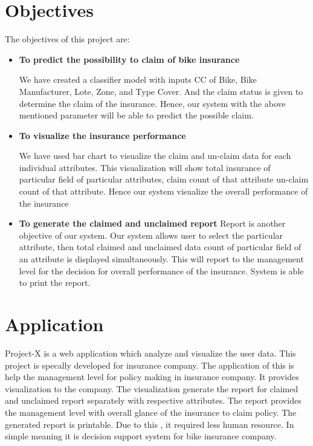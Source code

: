 \newpage
\section{Objectives}\label{sec:obj}
The objectives of this project are:
\begin{itemize}
\item \textbf{To predict the possibility to claim of bike insurance}
\par 
\par We have created a classifier model with inputs CC of Bike, Bike Manufacturer, Lote, Zone, and Type Cover. And the claim status is given to determine the claim of the insurance. Hence, our system with the above mentioned parameter will be able to predict the possible claim.
\item \textbf{To visualize the insurance performance} 
\par 
We have used bar chart to visualize the claim and un-claim data for each individual attributes. This visualization will show total insurance of particular field of particular attributes, claim count of that attribute un-claim count of that attribute. Hence our system visualize the overall performance of the insurance
\item \textbf{To generate the claimed and unclaimed report}
Report is another objective of our system. Our system allows user to select the particular attribute, then total claimed and unclaimed data count of particular field of an attribute is displayed simultaneously. This will report to the management level for the decision for overall performance of the insurance. System is able to print the report.
\end{itemize}

\section{Application}
Project-X is a web application which analyze and visualize the user data. This project is specally developed for insurance company. The application of this is help the  management level for policy making in insurance company. It provides visualization to the company. The visualization generate the report for claimed and unclaimed report separately with respective attributes. The report provides the management level with overall glance of the insurance to claim policy. The generated report is printable. Due to this , it required less human resource. In simple meaning it is decision support system for bike insurance company.


